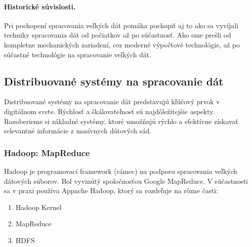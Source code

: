 \documentclass[10pt,slovak,a4paper]{article}
\begin{document}
\paragraph{Historické súvislosti.}
Pri pochopení spracovania veľkých dát pomáha pochopiť aj to ako sa vyvíjali techniky spracovania dát od počiatkov až po súčastnosť. Ako sme prešli od kompletne mechanických zariadení, cez moderné výpočtové technológie, až po súčastné technológie na spracovanie veľkých dát.

\subsection{Distribuované systémy na spracovanie dát} \label{Distribuovane}

Distribuované systémy na spracovanie dát predstavujú kľúčový prvok v digitálnom svete. Rýchlosť a škálovateľnosť sú najdôležitejšie aspekty. Rozoberieme si základné systémy, ktoré umožňujú rýchlo a efektívne získavať relevantné informácie z masívnych dátových sád.

\subsubsection {Hadoop: MapReduce}

Hadoop je programovací framework (rámec) na podporu spracovania veľkých dátových súborov. Bol vyvinútý spoločnosťou Google MapReduce. V súčastnosti sa v praxi používa Appache Hadoop, ktorý sa rozdeľuje na rôzne časti:

\begin{enumerate}
\item Hadoop Kernel
\item MapReduce
\item HDFS
\end{enumerate}
\end{document}
